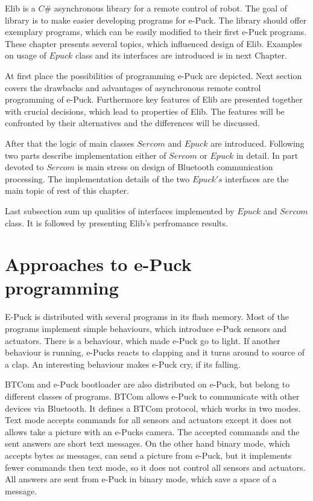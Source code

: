 	Elib is a $C\#$ asynchronous library for a remote control of robot. 
	The goal of library is to make easier developing programs for e-Puck.
	The library should offer exemplary programs, which can be easily modified to their first e-Puck programs.
	These chapter presents several topics, which influenced design of Elib.
	Examples on usage of $Epuck$ class and its interfaces are introduced is in next Chapter.

	At first place the possibilities of programming e-Puck are depicted.
	Next section covers the drawbacks and advantages of asynchronous remote control programming of e-Puck.
	Furthermore key features of Elib are presented together with crucial decisions, which
	lead to properties of Elib. 
	The features will be confronted by their alternatives and the differences will be discussed.

	After that the logic of main classes $Sercom$ and $Epuck$ are introduced. Following two parts 
	describe implementation either of $Sercom$ or $Epuck$ in detail. 
	In part devoted to $Sercom$ is main stress on design of Bluetooth communication processing.
	The implementation details of the two $Epuck's$ interfaces are the main topic of rest of this chapter. 

	Last subsection sum up qualities of interfaces implemented by $Epuck$ and $Sercom$ class.
	It is followed by presenting Elib's perfromance results.
\section{Approaches to e-Puck programming} \label{sec:approach}
	E-Puck is distributed with several programs in its flash memory. 
	Most of the programs implement simple behaviours, which introduce e-Puck sensors and actuators.
	There is a behaviour, which made e-Puck go to light. If another behaviour is running, e-Pucks
	reacts to clapping and it turns around to source of a clap. An interesting behaviour makes
	e-Puck cry, if its falling.
	 
	BTCom and e-Puck bootloader are also distributed on e-Puck, but belong to different classes of programs. 
	BTCom allows e-Puck to communicate with	other devices via Bluetooth.
	It defines a BTCom protocol, which works in two modes. Text mode accepts commands for
	all sensors and actuators except it does not allows take a picture with an e-Pucks camera. 
	The accepted commands and the sent answers are short text messages.
	On the other hand binary mode, which accepts bytes as messages,
	can send a picture from e-Puck, but it implements fewer commands
	then text mode, so it does not control all sensors and actuators. All answers are sent from e-Puck 
	in binary mode,	which save a space of a message.
	 
